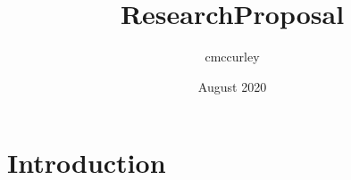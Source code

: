 \documentclass{article}
\title{ResearchProposal}
\author{cmccurley }
\date{August 2020}
\begin{document}
\maketitle

\section{Introduction}
\end{document}
